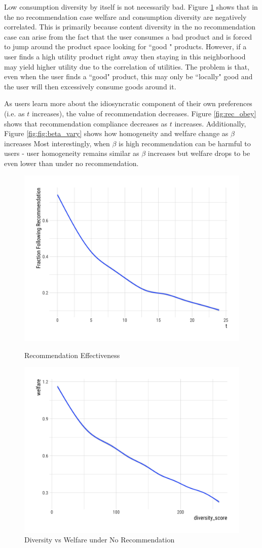 \documentclass[sigconf]{acmart}
\begin{document}
\par
Low consumption diversity by itself is not necessarily bad. Figure \ref{fig:diversity_welfare_no_rec} shows that in the no recommendation case welfare and consumption diversity are negatively correlated. This is primarily because content diversity in the no recommendation case can arise from the fact that the user consumes a bad product and is forced to jump around the product space looking for ``good " products. However, if a user finds a high utility product right away then staying in this neighborhood may yield higher utility due to the correlation of utilities. The problem is that, even when the user finds a ``good" product, this may only be ``locally" good and the user will then excessively consume goods around it.
\par
As users learn more about the idiosyncratic component of their own preferences (i.e. as $t$ increases), the value of recommendation decreases. Figure \ref{fig:rec_obey} shows that recommendation compliance decreases as $t$ increases. Additionally, Figure \ref{fig:fig:beta_vary} shows how homogeneity and welfare change as $\beta$ increases  Most interestingly, when $\beta$ is high recommendation can be harmful to users - user homogeneity remains similar as $\beta$ increases but welfare drops to be even lower than under no recommendation.


\begin{figure}
   \begin{minipage}{0.48\textwidth}
     \centering
     \includegraphics[width=.5\linewidth]{figures/rec_obedience_25}
     \caption{Recommendation Effectiveness}\label{fig:rec_obey}
   \end{minipage}\hfill
   \begin{minipage}{0.48\textwidth}
     \centering
     \includegraphics[width=.5\linewidth]{"figures/Diversity vs Welfare - No Recommendation"}
     \caption{Diversity vs Welfare under No Recommendation}\label{fig:diversity_welfare_no_rec}
   \end{minipage}
\end{figure}
\end{document}
